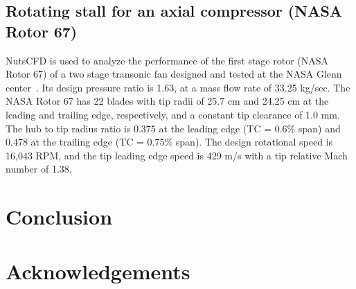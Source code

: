 \documentclass[journal,final]{new-aiaa}
\begin{document}
%
%
%
%

\subsection{Rotating stall for an axial compressor  (NASA Rotor 67)}
NutsCFD is used to analyze the performance of the first
stage rotor (NASA Rotor 67) of a two stage transonic fan
designed and tested at the NASA Glenn center~\cite{strazisar1989laser}.
Its design pressure ratio is
1.63, at a mass flow rate of 33.25 kg/sec. 
The NASA Rotor 67 has 22 blades with tip radii of 25.7 cm
and 24.25 cm at the leading and trailing edge, respectively,
and a constant tip clearance of 1.0 mm. The hub to tip radius
ratio is 0.375 at the leading edge (TC = 0.6\% span) and 0.478
at the trailing edge (TC = 0.75\% span). The design rotational
speed is 16,043 RPM, and the tip leading edge speed is 429 m/s
with a tip relative Mach number of 1.38.

\section{Conclusion}
\label{conclusion}

\section*{Acknowledgements}


\end{document}
